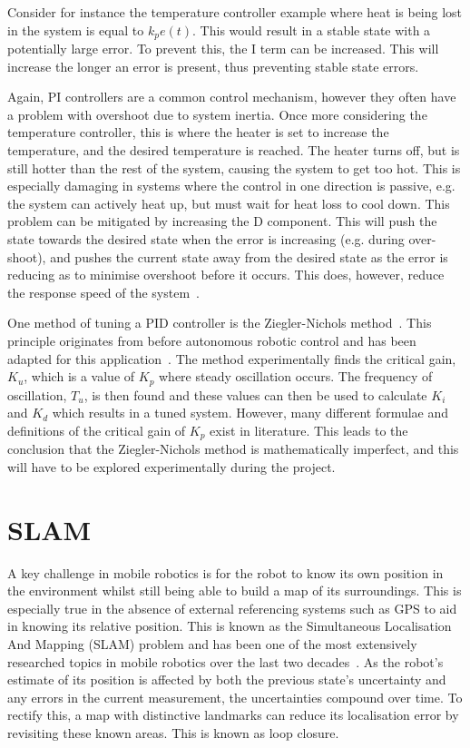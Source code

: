 Consider for instance the temperature controller example where heat is being
lost in the system is equal to $k_{p}e(t)$. This would
result in a stable state with a potentially large error. To prevent this,
the I term can be increased. This will increase the longer an error is
present, thus preventing stable state errors.

Again, PI controllers are a common control mechanism, however they often have
a problem with overshoot due to system inertia. Once more considering the
temperature controller, this is where the heater is set to increase the
temperature, and the desired temperature is reached. The heater turns off, but
is still hotter than the rest of the system, causing the system to get too hot.
This is especially damaging in systems where the control in one direction
is passive, e.g. the system can actively heat up, but must wait for heat loss
to cool down. This problem can be mitigated by increasing the D component.
This will push the state towards the desired state when the error is increasing
(e.g. during over-shoot), and pushes the current state away from the desired
state as the error is reducing as to minimise overshoot before it
occurs. This does, however, reduce the response speed of the system~\cite{chen2007linear}.

One method of tuning a PID controller is the Ziegler-Nichols method~\cite{ziegler1942optimum}. This principle originates from before autonomous
robotic control and has been adapted for this application~\cite{aastrom2004revisiting}. The method experimentally finds the critical gain, $K_u$, which is a value of $K_p$
where steady oscillation occurs. The frequency of oscillation, $T_u$, is then found and
these values can then be used to calculate $K_i$ and $K_d$ which results in a
tuned system. However, many different formulae and definitions of the critical
gain of $K_p$ exist in literature. This leads to the conclusion that the
Ziegler-Nichols method is mathematically imperfect, and this will have to be
explored experimentally during the project.

\section{SLAM}\label{litreview/slam}
A key challenge in mobile robotics is for the robot to know its own position in the
environment whilst still being able to build a map of its surroundings.
This is especially true in the absence of external referencing systems
such as GPS to aid in knowing its relative position. This is known as the Simultaneous Localisation And Mapping (SLAM)
problem and has been one of the most extensively researched topics in mobile
robotics over the last two decades~\cite{grisetti2010tutorial}. As the robot's
estimate of its position is affected by both the previous state's uncertainty
and any errors in the current measurement, the uncertainties compound
over time. To rectify this, a map with distinctive landmarks can reduce its
localisation error by revisiting these known areas. This is known as loop closure.


